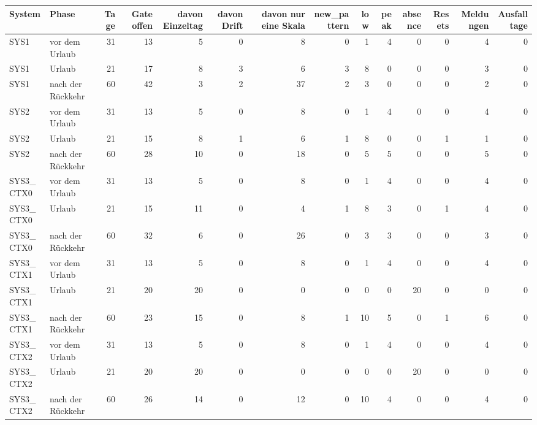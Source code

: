 \begin{tabular}{llrrrrrrrrrrrr}
\toprule
System & Phase & Tage & Gate offen & davon Einzeltag & davon Drift & davon nur eine Skala & new\_pattern & low & peak & absence & Resets & Meldungen & Ausfalltage \\
\midrule
SYS1 & vor dem Urlaub & 31 & 13 & 5 & 0 & 8 & 0 & 1 & 4 & 0 & 0 & 4 & 0 \\
SYS1 & Urlaub & 21 & 17 & 8 & 3 & 6 & 3 & 8 & 0 & 0 & 0 & 3 & 0 \\
SYS1 & nach der Rückkehr & 60 & 42 & 3 & 2 & 37 & 2 & 3 & 0 & 0 & 0 & 2 & 0 \\
SYS2 & vor dem Urlaub & 31 & 13 & 5 & 0 & 8 & 0 & 1 & 4 & 0 & 0 & 4 & 0 \\
SYS2 & Urlaub & 21 & 15 & 8 & 1 & 6 & 1 & 8 & 0 & 0 & 1 & 1 & 0 \\
SYS2 & nach der Rückkehr & 60 & 28 & 10 & 0 & 18 & 0 & 5 & 5 & 0 & 0 & 5 & 0 \\
SYS3\_CTX0 & vor dem Urlaub & 31 & 13 & 5 & 0 & 8 & 0 & 1 & 4 & 0 & 0 & 4 & 0 \\
SYS3\_CTX0 & Urlaub & 21 & 15 & 11 & 0 & 4 & 1 & 8 & 3 & 0 & 1 & 4 & 0 \\
SYS3\_CTX0 & nach der Rückkehr & 60 & 32 & 6 & 0 & 26 & 0 & 3 & 3 & 0 & 0 & 3 & 0 \\
SYS3\_CTX1 & vor dem Urlaub & 31 & 13 & 5 & 0 & 8 & 0 & 1 & 4 & 0 & 0 & 4 & 0 \\
SYS3\_CTX1 & Urlaub & 21 & 20 & 20 & 0 & 0 & 0 & 0 & 0 & 20 & 0 & 0 & 0 \\
SYS3\_CTX1 & nach der Rückkehr & 60 & 23 & 15 & 0 & 8 & 1 & 10 & 5 & 0 & 1 & 6 & 0 \\
SYS3\_CTX2 & vor dem Urlaub & 31 & 13 & 5 & 0 & 8 & 0 & 1 & 4 & 0 & 0 & 4 & 0 \\
SYS3\_CTX2 & Urlaub & 21 & 20 & 20 & 0 & 0 & 0 & 0 & 0 & 20 & 0 & 0 & 0 \\
SYS3\_CTX2 & nach der Rückkehr & 60 & 26 & 14 & 0 & 12 & 0 & 10 & 4 & 0 & 0 & 4 & 0 \\
\bottomrule
\end{tabular}
